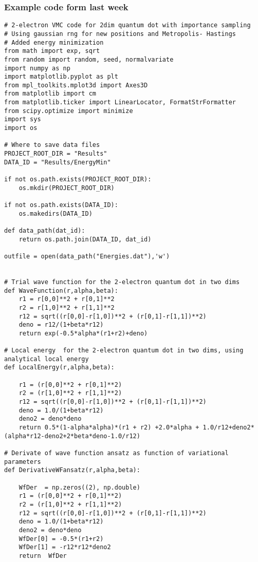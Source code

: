 \documentclass{beamer}
\begin{document}
\begin{frame}
\frametitle{Example code form last week}

\begin{verbatim}
# 2-electron VMC code for 2dim quantum dot with importance sampling
# Using gaussian rng for new positions and Metropolis- Hastings 
# Added energy minimization
from math import exp, sqrt
from random import random, seed, normalvariate
import numpy as np
import matplotlib.pyplot as plt
from mpl_toolkits.mplot3d import Axes3D
from matplotlib import cm
from matplotlib.ticker import LinearLocator, FormatStrFormatter
from scipy.optimize import minimize
import sys
import os

# Where to save data files
PROJECT_ROOT_DIR = "Results"
DATA_ID = "Results/EnergyMin"

if not os.path.exists(PROJECT_ROOT_DIR):
    os.mkdir(PROJECT_ROOT_DIR)

if not os.path.exists(DATA_ID):
    os.makedirs(DATA_ID)

def data_path(dat_id):
    return os.path.join(DATA_ID, dat_id)

outfile = open(data_path("Energies.dat"),'w')


# Trial wave function for the 2-electron quantum dot in two dims
def WaveFunction(r,alpha,beta):
    r1 = r[0,0]**2 + r[0,1]**2
    r2 = r[1,0]**2 + r[1,1]**2
    r12 = sqrt((r[0,0]-r[1,0])**2 + (r[0,1]-r[1,1])**2)
    deno = r12/(1+beta*r12)
    return exp(-0.5*alpha*(r1+r2)+deno)

# Local energy  for the 2-electron quantum dot in two dims, using analytical local energy
def LocalEnergy(r,alpha,beta):
    
    r1 = (r[0,0]**2 + r[0,1]**2)
    r2 = (r[1,0]**2 + r[1,1]**2)
    r12 = sqrt((r[0,0]-r[1,0])**2 + (r[0,1]-r[1,1])**2)
    deno = 1.0/(1+beta*r12)
    deno2 = deno*deno
    return 0.5*(1-alpha*alpha)*(r1 + r2) +2.0*alpha + 1.0/r12+deno2*(alpha*r12-deno2+2*beta*deno-1.0/r12)

# Derivate of wave function ansatz as function of variational parameters
def DerivativeWFansatz(r,alpha,beta):
    
    WfDer  = np.zeros((2), np.double)
    r1 = (r[0,0]**2 + r[0,1]**2)
    r2 = (r[1,0]**2 + r[1,1]**2)
    r12 = sqrt((r[0,0]-r[1,0])**2 + (r[0,1]-r[1,1])**2)
    deno = 1.0/(1+beta*r12)
    deno2 = deno*deno
    WfDer[0] = -0.5*(r1+r2)
    WfDer[1] = -r12*r12*deno2
    return  WfDer


\end{verbatim}
\end{frame}
\end{document}
